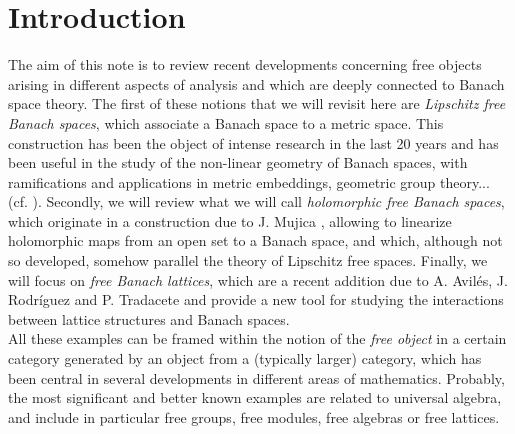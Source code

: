 \documentclass[12pt,leqno]{amsart}
\numberwithin{equation}{section} %
\theoremstyle{definition}
\numberwithin{equation}{section}
\begin{document}
\section{Introduction}

The aim of this note is to review recent developments concerning free objects arising in different aspects of analysis and which are deeply connected to Banach space theory. The first of these notions that we will revisit here are \emph{Lipschitz free Banach spaces}, which associate a Banach space to a metric space. This construction has been the object of intense research in the last 20 years and has been useful in the study of the non-linear geometry of Banach spaces, with ramifications and applications in metric embeddings, geometric group theory... (cf. \cite{BL,CKN,Naor}). Secondly, we will review what we will call \emph{holomorphic free Banach spaces}, which originate in a construction due to J. Mujica \cite{Mujica91}, allowing to linearize holomorphic maps from an open set to a Banach space, and which, although not so developed, somehow parallel the theory of Lipschitz free spaces. Finally, we will focus on \emph{free Banach lattices}, which are a recent addition due to A. Avil\'es, J. Rodr\'iguez and P. Tradacete \cite{ART} and provide a new tool for studying the interactions between lattice structures and Banach spaces.  \\

All these examples can be framed within the notion of the \emph{free object} in a certain category generated by an object from a (typically larger) category, which has been central in several developments in different areas of mathematics. Probably, the most significant and better known examples are related to universal algebra, and include in particular free groups, free modules, free algebras or free lattices. \\
\end{document}
